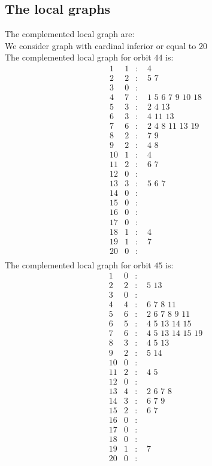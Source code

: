 \documentclass[12pt]{article}
\begin{document}
\subsection{The local graphs}
The complemented local graph are:\\
We consider graph with cardinal inferior or equal to $20$\\
The complemented local graph for orbit $44$ is:
\begin{equation*}
\begin{array}{rrcl}
1&1&:&\,\,4\\
2&2&:&\,\,5\,\,7\\
3&0&:&\\
4&7&:&\,\,1\,\,5\,\,6\,\,7\,\,9\,\,10\,\,18\\
5&3&:&\,\,2\,\,4\,\,13\\
6&3&:&\,\,4\,\,11\,\,13\\
7&6&:&\,\,2\,\,4\,\,8\,\,11\,\,13\,\,19\\
8&2&:&\,\,7\,\,9\\
9&2&:&\,\,4\,\,8\\
10&1&:&\,\,4\\
11&2&:&\,\,6\,\,7\\
12&0&:&\\
13&3&:&\,\,5\,\,6\,\,7\\
14&0&:&\\
15&0&:&\\
16&0&:&\\
17&0&:&\\
18&1&:&\,\,4\\
19&1&:&\,\,7\\
20&0&:&\\
\end{array}
\end{equation*}
The complemented local graph for orbit $45$ is:
\begin{equation*}
\begin{array}{rrcl}
1&0&:&\\
2&2&:&\,\,5\,\,13\\
3&0&:&\\
4&4&:&\,\,6\,\,7\,\,8\,\,11\\
5&6&:&\,\,2\,\,6\,\,7\,\,8\,\,9\,\,11\\
6&5&:&\,\,4\,\,5\,\,13\,\,14\,\,15\\
7&6&:&\,\,4\,\,5\,\,13\,\,14\,\,15\,\,19\\
8&3&:&\,\,4\,\,5\,\,13\\
9&2&:&\,\,5\,\,14\\
10&0&:&\\
11&2&:&\,\,4\,\,5\\
12&0&:&\\
13&4&:&\,\,2\,\,6\,\,7\,\,8\\
14&3&:&\,\,6\,\,7\,\,9\\
15&2&:&\,\,6\,\,7\\
16&0&:&\\
17&0&:&\\
18&0&:&\\
19&1&:&\,\,7\\
20&0&:&\\
\end{array}
\end{equation*}
\end{document}
